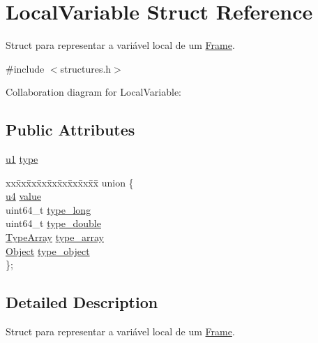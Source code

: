 \hypertarget{structLocalVariable}{}\section{Local\+Variable Struct Reference}
\label{structLocalVariable}


Struct para representar a variável local de um \hyperlink{structFrame}{Frame}.  




{\ttfamily \#include $<$structures.\+h$>$}



Collaboration diagram for Local\+Variable\+:
\subsection*{Public Attributes}
\begin{DoxyCompactItemize}
\item 
\hyperlink{structures_8h_a64f8055b64cf2a4c299c841130c5c938}{u1} \hyperlink{structLocalVariable_a05438f40d41a69cde0a4d50a37bf9420}{type}
\item 
\begin{tabbing}
xx\=xx\=xx\=xx\=xx\=xx\=xx\=xx\=xx\=\kill
union \{\\
\>\hyperlink{structures_8h_ae391a1d79bb0c8cbc283f0283e3c098b}{u4} \hyperlink{structLocalVariable_aee58138d840bf24f71cd8c4fd2f84db7}{value}\\
\>uint64\_t \hyperlink{structLocalVariable_af14e5709d8a7c9397571316821b9171b}{type\_long}\\
\>uint64\_t \hyperlink{structLocalVariable_a488dfde0ac92dbb3f2b4d56280771141}{type\_double}\\
\>\hyperlink{structTypeArray}{TypeArray} \hyperlink{structLocalVariable_a6905d4b07d1ff41deaa0189ae8761850}{type\_array}\\
\>\hyperlink{structObject}{Object} \hyperlink{structLocalVariable_ae6f28a6c3ea7313de860a8e46adf661f}{type\_object}\\
\}; \\

\end{tabbing}\end{DoxyCompactItemize}


\subsection{Detailed Description}
Struct para representar a variável local de um \hyperlink{structFrame}{Frame}. 

